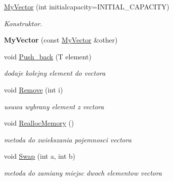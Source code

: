 \begin{DoxyCompactItemize}
\item 
\mbox{\label{class_my_vector_a8fd71ac4f7522c6860dc859e9b46f4c9}} 
\hyperlink{class_my_vector_a8fd71ac4f7522c6860dc859e9b46f4c9}{My\+Vector} (int initialcapacity=I\+N\+I\+T\+I\+A\+L\+\_\+\+C\+A\+P\+A\+C\+I\+TY)
\begin{DoxyCompactList}\small\item\em Konstruktor. \end{DoxyCompactList}\item 
\mbox{\label{class_my_vector_a8f6c36029da3c2bf3e31f52ff003ad85}} 
{\bfseries My\+Vector} (const \hyperlink{class_my_vector}{My\+Vector} \&other)
\item 
\mbox{\label{class_my_vector_a9c0be74e27cccdde01b7e8de25062e3a}} 
void \hyperlink{class_my_vector_a9c0be74e27cccdde01b7e8de25062e3a}{Push\+\_\+back} (T element)
\begin{DoxyCompactList}\small\item\em dodaje kolejny element do vectora \end{DoxyCompactList}\item 
\mbox{\label{class_my_vector_accc75234d364f6e2356186472fd2f3d0}} 
void \hyperlink{class_my_vector_accc75234d364f6e2356186472fd2f3d0}{Remove} (int i)
\begin{DoxyCompactList}\small\item\em usuwa wybrany element z vectora \end{DoxyCompactList}\item 
\mbox{\label{class_my_vector_ab87ba4083f12bfc489df397d8dd7db28}} 
void \hyperlink{class_my_vector_ab87ba4083f12bfc489df397d8dd7db28}{Realloc\+Memory} ()
\begin{DoxyCompactList}\small\item\em metoda do zwiekszania pojemnosci vectora \end{DoxyCompactList}\item 
\mbox{\label{class_my_vector_a4c3911ce63996b9695c34d6a2961be22}} 
void \hyperlink{class_my_vector_a4c3911ce63996b9695c34d6a2961be22}{Swap} (int a, int b)
\begin{DoxyCompactList}\small\item\em metoda do zamiany miejsc dwoch elementow vectora \end{DoxyCompactList}\item 

\end{DoxyCompactItemize}
